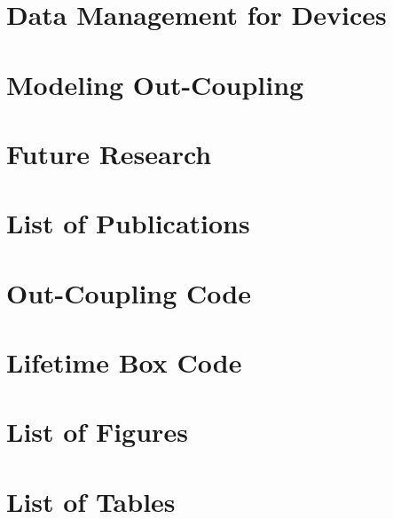 \documentclass{article}
\begin{document}
\section{Data Management for Devices}

\newpage

\section{Modeling Out-Coupling}

\newpage

\section{Future Research}

\newpage



\newpage

\appendix
\appendixpage
\addappheadtotoc
\section{List of Publications}

\newpage

\section{Out-Coupling Code}
\newpage

\section{Lifetime Box Code}
\newpage

\section{List of Figures}
\listoffigures
\newpage

\section{List of Tables}
\listoftables
\newpage
\end{document}
